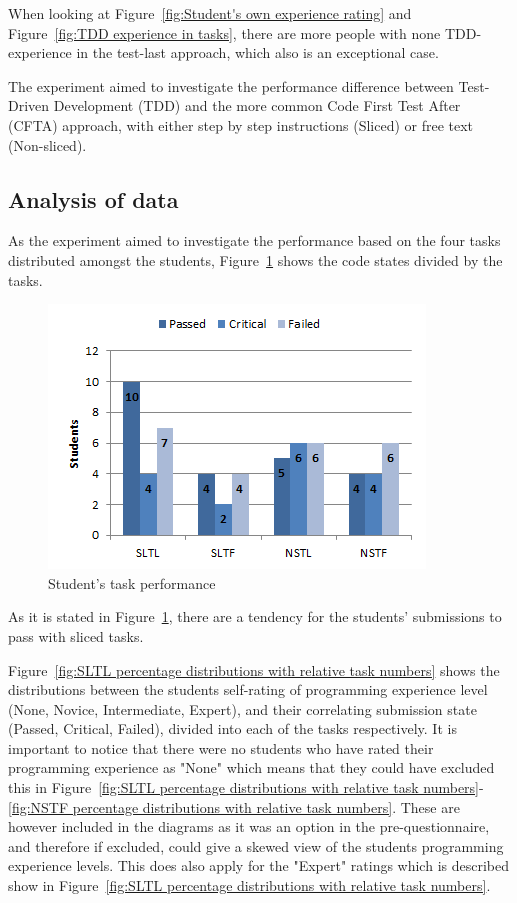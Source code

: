 \documentclass{sig-alternate-05-2015}
\begin{document}
When looking at Figure~\ref{fig:Student's own experience rating} and Figure~\ref{fig:TDD experience in tasks}, there are more people with none TDD-experience in the test-last approach, which also is an exceptional case.

The experiment aimed to investigate the performance difference between Test-Driven Development (TDD) and the more common Code First Test After (CFTA) approach, with either step by step instructions (Sliced) or free text (Non-sliced).\\

\subsection{Analysis of data} %
As the experiment aimed to investigate the performance based on the four tasks distributed amongst the students, Figure~\ref{fig:Student's task performance} shows the code states divided by the tasks.

\begin{figure}[!ht]
	\centering
	\includegraphics[width=1\linewidth]{img05}
	\caption{Student's task performance}
	\label{fig:Student's task performance}
\end{figure}

As it is stated in Figure~\ref{fig:Student's task performance}, there are a tendency for the students' submissions to pass with sliced tasks.

Figure~\ref{fig:SLTL percentage distributions with relative task numbers} shows the distributions between the students self-rating of programming experience level (None, Novice, Intermediate, Expert), and their correlating submission state (Passed, Critical, Failed), divided into each of the tasks respectively.
It is important to notice that there were no students who have rated their programming experience  as "None" which means that they could have excluded this in Figure~\ref{fig:SLTL percentage distributions with relative task numbers}-\ref{fig:NSTF percentage distributions with relative task numbers}. These are however included in the diagrams as it was an option in the pre-questionnaire, and therefore if excluded, could give a skewed view of the students programming experience levels. This does also apply for the "Expert" ratings which is described show in Figure~\ref{fig:SLTL percentage distributions with relative task numbers}.
\end{document}
